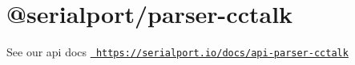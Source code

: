 \chapter{@serialport/parser-\/cctalk}
\hypertarget{md_Dashboard_2node__modules_2_0dserialport_2parser-cctalk_2README}{}\label{md_Dashboard_2node__modules_2_0dserialport_2parser-cctalk_2README}
\label{md_Dashboard_2node__modules_2_0dserialport_2parser-cctalk_2README_autotoc_md84}%
%
 See our api docs \href{https://serialport.io/docs/api-parser-cctalk}{\texttt{ https\+://serialport.\+io/docs/api-\/parser-\/cctalk}} 